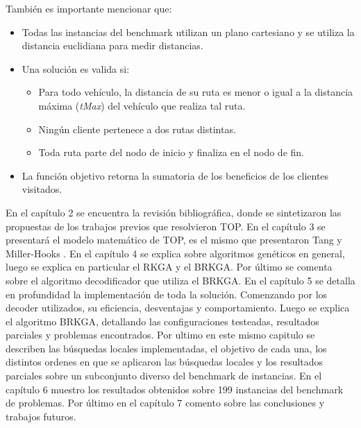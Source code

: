 \begin{minipage}{\textwidth}
También es importante mencionar que:

\begin{itemize}
	\item Todas las instancias del benchmark utilizan un plano cartesiano y se utiliza la distancia euclidiana para medir distancias.
	\item Una solución es valida si:
	\begin{itemize}
		\item Para todo vehículo, la distancia de su ruta es menor o igual a la distancia máxima (\textit{tMax}) del vehículo que realiza tal ruta.
		\item Ningún cliente pertenece a dos rutas distintas.
		\item Toda ruta parte del nodo de inicio y finaliza en el nodo de fin.
	\end{itemize}
	\item La función objetivo retorna la sumatoria de los beneficios de los clientes visitados.
\end{itemize}
\end{minipage}

\bigskip

En el capítulo 2 se encuentra la revisión bibliográfica, donde se sintetizaron las propuestas de los trabajos previos que resolvieron TOP.
En el capítulo 3 se presentará el modelo matemático de TOP, es el mismo que presentaron Tang y Miller-Hooks \cite{TangMillerHooks} .
En el capítulo 4 se explica sobre algoritmos genéticos en general, luego se explica en particular el RKGA y el BRKGA. Por último se comenta sobre el algoritmo decodificador que utiliza el BRKGA.
En el capítulo 5 se detalla en profundidad la implementación de toda la solución. Comenzando por los decoder utilizados, su eficiencia, desventajas y comportamiento. Luego se explica el algoritmo BRKGA, detallando las configuraciones testeadas, resultados parciales y problemas encontrados. Por ultimo en este mismo capitulo se describen las búsquedas locales implementadas, el objetivo de cada una, los distintos ordenes en que se aplicaron las búsquedas locales y los resultados parciales sobre un subconjunto diverso del benchmark de instancias.
En el capítulo 6 muestro los resultados obtenidos sobre 199 instancias del benchmark de problemas.
Por último en el capítulo 7 comento sobre las conclusiones y trabajos futuros.


























